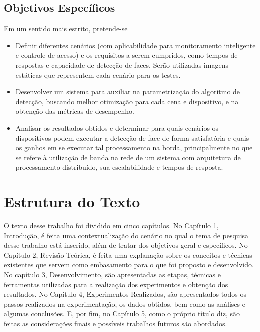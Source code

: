 \subsection{Objetivos Específicos}
Em um sentido mais estrito, pretende-se
\begin{itemize}
    \item Definir diferentes cenários (com aplicabilidade para monitoramento inteligente e controle de acesso) e os requisitos a serem cumpridos, como tempos de respostas e capacidade de detecção de faces. Serão utilizadas imagens estáticas que representem cada cenário para os testes.
    \item Desenvolver um sistema para auxiliar na parametrização do algoritmo de detecção, buscando melhor otimização para cada cena e dispositivo, e na obtenção das métricas de desempenho.
    \item Analisar os resultados obtidos e determinar para quais cenários os dispositivos podem executar a detecção de face de forma satisfatória e quais os ganhos em se executar tal processamento na borda, principalmente no que se refere à utilização de banda na rede de um sistema com arquitetura de processamento distribuído, sua escalabilidade e tempos de resposta.
\end{itemize}

\section{Estrutura do Texto}
O texto desse trabalho foi dividido em cinco capítulos. No Capítulo 1, Introdução, é feita uma contextualização do cenário no qual o tema de pesquisa desse trabalho está inserido, além de tratar dos objetivos geral e específicos. No Capítulo 2, Revisão Teórica, é feita uma explanação sobre os conceitos e técnicas existentes que servem como embasamento para o que foi proposto e desenvolvido. No capítulo 3, Desenvolvimento, são apresentadas as etapas, técnicas e ferramentas utilizadas para a realização dos experimentos e obtenção dos resultados. No Capítulo 4, Experimentos Realizados, são apresentados todos os passos realizados na experimentação, os dados obtidos, bem como as análises e algumas conclusões. E, por fim, no Capítulo 5, como o próprio título diz, são feitas as considerações finais e possíveis trabalhos futuros são abordados.
